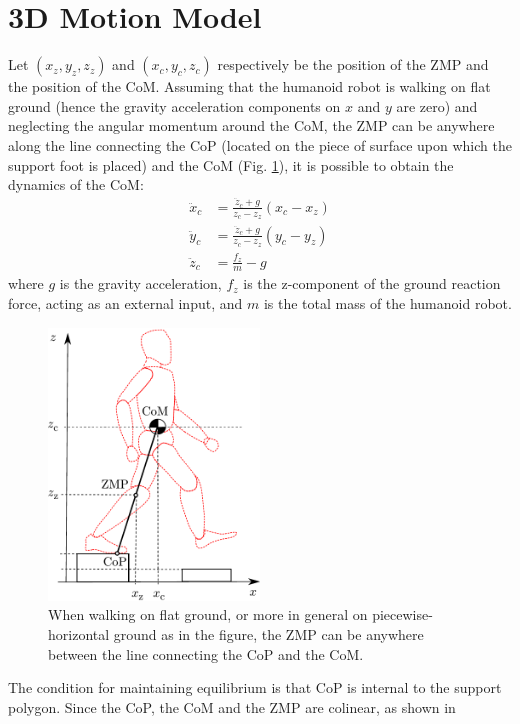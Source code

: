 \section{3D Motion Model}
Let $(x_z, y_z, z_z)$ and $(x_c, y_c, z_c)$ respectively be the position of 
the ZMP and the position of the CoM. Assuming that the humanoid robot is walking 
on flat ground (hence the gravity acceleration components on $x$ and $y$ are 
zero) and neglecting the angular momentum around the CoM, the ZMP can be 
anywhere along the line connecting the CoP (located on the piece of surface 
upon which the support foot is placed) and the CoM (Fig. \ref{fig:lipm-robot}),
it is possible
\cite{kajita:intro-humanoid-robotics} to obtain the dynamics of the CoM:
\begin{align}
  \ddot{x}_c &= \frac{\ddot{z}_c + g}{z_c - z_z} (x_c - x_z) \\
  \ddot{y}_c &= \frac{\ddot{z}_c + g}{z_c - z_z} (y_c - y_z) \\
  \ddot{z}_c &= \frac{f_z}{m} - g
\end{align}
where $g$ is the gravity acceleration, $f_z$ is the z-component of the ground
reaction force, acting as an external input, and $m$ is the total mass of
the humanoid robot.
\begin{figure}
    \centering
    \includegraphics[width=0.5\textwidth]{figures/LIPM_robot.pdf}
    \caption{When walking on flat ground, or more in general on
        piecewise-horizontal ground as in the figure, the ZMP can be anywhere 
        between the line connecting the CoP and the CoM.}
    \label{fig:lipm-robot}
\end{figure}
The condition for maintaining equilibrium is that CoP is internal to the 
support polygon. Since the CoP, the CoM and the ZMP are colinear, as shown in 
